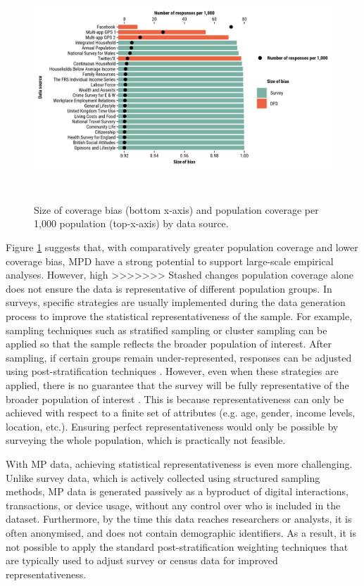 \documentclass[]{rsos}%
\begin{document}
\begin{figure}
\centering
\includegraphics[width=14cm,height=8.5cm]{figures/compare-surveys-legend.png}
\caption{Size of coverage bias (bottom x-axis) and population coverage per
1,000 population (top-x-axis) by data
source.}\label{fig:survey}
\end{figure}

Figure \ref{fig:survey} suggests that, with comparatively greater
population coverage and lower coverage bias, MPD have a strong potential
to support large-scale empirical analyses.
However, high
>>>>>>> Stashed changes
population coverage alone does not ensure the data is representative of
different population groups. In surveys, specific strategies are usually
implemented during the data generation process to improve the
statistical representativeness of the sample. For example, sampling
techniques such as stratified sampling or cluster sampling can be
applied so that the sample reflects the broader population of interest.
After sampling, if certain groups remain under-represented, responses
can be adjusted using post-stratification techniques \citep{lohr2021}.
However, even when these strategies are applied, there is no guarantee
that the survey will be fully representative of the broader population
of interest \citep{cochran1977sampling}. This is because representativeness
can only be achieved with respect to a finite set of attributes (e.g.
age, gender, income levels, location, etc.). Ensuring perfect
representativeness would only be possible by surveying the whole
population, which is practically not feasible.

With MP data, achieving statistical representativeness is even more
challenging. Unlike survey data, which is actively collected using
structured sampling methods, MP data is generated passively as a
byproduct of digital interactions, transactions, or device usage,
without any control over who is included in the dataset. Furthermore, by
the time this data reaches researchers or analysts, it is often
anonymised, and does not contain demographic identifiers. As a result,
it is not possible to apply the standard post-stratification weighting
techniques that are typically used to adjust survey or census data for
improved representativeness.
\end{document}
